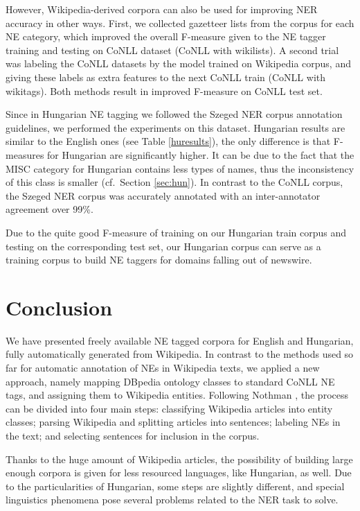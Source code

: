 \documentclass[11pt]{article}
\begin{document}
However, Wikipedia-derived corpora can also be used for improving NER accuracy in other ways. First, we collected gazetteer lists from the corpus for each NE category, which improved the overall F-measure given to the NE tagger training and testing on CoNLL dataset (CoNLL with wikilists). A second trial was labeling the CoNLL datasets by the model trained on Wikipedia corpus, and giving these labels as extra features to the next CoNLL train (CoNLL with wikitags). Both methods result in improved F-measure on CoNLL test set.  

Since in Hungarian NE tagging we followed the Szeged NER corpus annotation guidelines, we performed the experiments on this dataset. Hungarian results are similar to the English ones (see Table \ref{huresults}), the only difference is that F-measures for Hungarian are significantly higher. It can be due to the fact that the MISC category for Hungarian contains less types of names, thus the inconsistency of this class is smaller (cf.~Section \ref{sec:hun}). In contrast to the CoNLL corpus, the Szeged NER corpus was accurately annotated with an inter-annotator agreement over 99\%.  

Due to the quite good F-measure of training on our Hungarian train corpus and testing on the corresponding test set, our Hungarian corpus can serve as a training corpus to build NE taggers for domains falling out of newswire. 

\section{Conclusion}
\label{sec:conclusion}

We have presented freely available NE tagged corpora for English and Hungarian, fully automatically generated from Wikipedia. In contrast to the methods used so far for automatic annotation of NEs in Wikipedia texts, we applied a new approach, namely mapping DBpedia ontology classes to standard CoNLL NE tags, and assigning them to Wikipedia entities. Following Nothman , the process can be divided into four main steps:  classifying Wikipedia articles into entity classes; parsing Wikipedia and splitting articles into sentences; labeling NEs in the text; and selecting sentences for inclusion in the corpus. 

Thanks to the huge amount of Wikipedia articles, the possibility of building large enough corpora is given for less resourced languages, like Hungarian, as well. Due to the particularities of Hungarian, some steps are slightly different, and special linguistics phenomena pose several problems related to the NER task to solve. 
\end{document}
